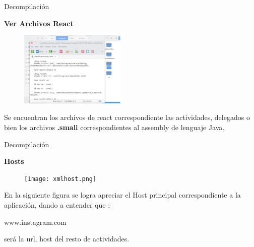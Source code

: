 \begin{frame}[t,fragile]{Decompilación}

\textbf{Ver Archivos React}

\begin{figure} 
\vspace{2pt}
  \begin{center}
    \includegraphics[width=0.45\textwidth]{react.png}
    \label{fig:databaseUserTable}
  \end{center}
  \vspace{2pt}
\end{figure} 

\bigskip

 Se encuentran los archivos de react correspondiente las actividades, delegados o bien los archivos \textbf{.smali} correspondientes al assembly de lenguaje Java.

\end{frame}


\begin{frame}[t,fragile]{Decompilación}

\textbf{Hosts}

\begin{figure} 
\vspace{2pt}
  \begin{center}
    \texttt{[image: xmlhost.png]}
    \label{fig:databaseUserTable}
  \end{center}
  \vspace{2pt}
\end{figure} 

\bigskip

En la siguiente figura se logra apreciar el Host principal correspondiente a la aplicación, dando a entender que :

\begin{center}
    www.instagram.com    
\end{center}
será la url, host del resto de actividades.



\end{frame}

